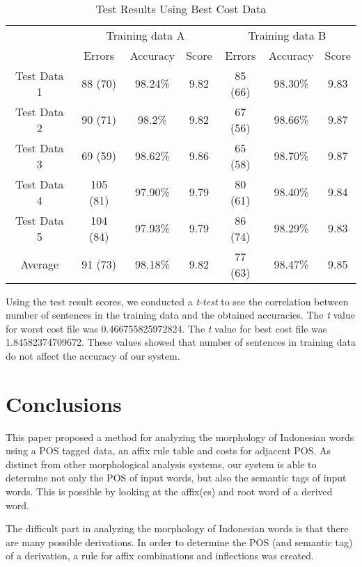 \documentclass[english]{nlp}
\begin{document}
\begin{table}[ht]
\begin{center}
\caption{Test Results Using Best Cost Data}
~\\\vspace{-2mm}
\label{table:test_resultsB}
\begin{tabular}{|c|c|c|c|c|c|c|}
\cline{2-7}
\multicolumn{1}{c}{~} & \multicolumn{3}{|c|}{Training data A} & \multicolumn{3}{|c|}{Training data B} \\
\cline{2-7}
\cline{2-7}
\multicolumn{1}{c|}{~} & Errors & Accuracy & Score & Errors & Accuracy & Score\\
\hline
\hline
Test Data 1 & 88 (70) & 98.24\% & 9.82 & 85 (66) & 98.30\% & 9.83\\ 
\hline
Test Data 2 & 90 (71) & 98.2\% & 9.82 & 67 (56) & 98.66\% & 9.87\\ 
\hline
Test Data 3 & 69 (59) & 98.62\% & 9.86 & 65 (58) & 98.70\% & 9.87\\ 
\hline
Test Data 4 & 105 (81) & 97.90\% & 9.79 & 80 (61) & 98.40\% & 9.84\\ 
\hline
Test Data 5 & 104 (84) & 97.93\% & 9.79 & 86 (74) & 98.29\% & 9.83\\ 
\hline
\hline
Average & 91 (73) & 98.18\% & 9.82 & 77 (63) & 98.47\% & 9.85\\ 
\hline
\end{tabular}
\end{center}
\end{table}
Using the test result scores, we conducted a {\it t-test} \cite{Chase}
to see the correlation between number of sentences in the training data 
and the obtained accuracies.
The {\it t} value for worst cost file was 0.466755825972824.
The {\it t} value for best cost file was 1.84582374709672.
These values showed that number of sentences in training data do not
affect the accuracy of our system.

\section{Conclusions}
This paper proposed a method for analyzing the morphology of
Indonesian words using a POS tagged data, an affix
rule table and costs for adjacent POS.
As distinct from other morphological analysis systems, our system is able
to determine not only the POS of input words, but also
the semantic tags of input words. This is possible by looking
at the affix(es) and root word of a derived word.

The difficult part in analyzing the morphology of Indonesian words
is that there are many possible derivations.
In order to determine the POS (and semantic tag) of a derivation,
a rule for affix combinations and inflections was created.
\end{document}
